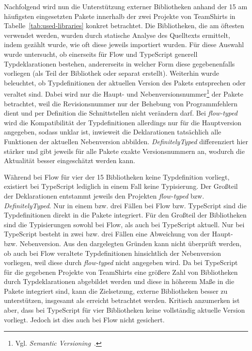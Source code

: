 Nachfolgend wird nun die Unterstützung externer Bibliotheken anhand der 15 am häufigsten eingesetzten Pakete innerhalb der zwei Projekte von TeamShirts in Tabelle~\ref{tab:used-libraries} konkret betrachtet. Die Bibliotheken, die am öftesten verwendet werden, wurden durch statische Analyse des Quelltexts ermittelt, indem gezählt wurde, wie oft diese jeweils importiert wurden. Für diese Auswahl wurde untersucht, ob einerseits für Flow und TypeScript generell Typdeklarationen bestehen, andererseits in welcher Form diese gegebenenfalls vorliegen (als Teil der Bibliothek oder separat erstellt). Weiterhin wurde beleuchtet, ob Typdefinitionen der aktuellen Version des Pakets entsprechen oder veraltet sind. Dabei wird nur die Haupt- und Nebenversionsnummer\footnote{Vgl. \textit{Semantic Versioning}~\autocite{SEMANTIC_VERSIONING}.} der Pakete betrachtet, weil die Revisionsnummer nur der Behebung von Programmfehlern dient und per Definition die Schnittstellen nicht verändern darf. Bei \textit{flow-typed} wird die Kompatibilität der Typdefinitionen allerdings nur für die Hauptversion angegeben, sodass unklar ist, inwieweit die Deklarationen tatsächlich alle Funktionen der aktuellen Nebenversion abbilden. \textit{DefinitelyTyped} differenziert hier stärker und gibt jeweils für alle Pakete exakte Versionsnummern an, wodurch die Aktualität besser eingeschätzt werden kann.

\medbreak


Während bei Flow für vier der 15 Bibliotheken keine Typdefinition vorliegt, existiert bei TypeScript lediglich in einem Fall keine Typisierung. Der Großteil der Deklarationen entstammt jeweils den Projekten \textit{flow-typed} bzw. \textit{DefinitelyTyped}. Nur in einem bzw. drei Fällen bei Flow bzw. TypeScript sind die Typdefinitionen direkt in die Pakete integriert.
Für den Großteil der Bibliotheken sind die Typisierungen sowohl bei Flow, als auch bei TypeScript aktuell. Nur bei TypeScript besteht in zwei bzw. drei Fällen eine Abweichung von der Haupt- bzw. Nebenversion. Aus den dargelegten Gründen kann nicht überprüft werden, ob auch bei Flow veraltete Typdefinitionen hinsichtlich der Nebenversion vorliegen, weil diese durch \textit{flow-typed} nicht angegeben wird. Da bei TypeScript für die gegebenen Projekte von TeamShirts eine größere Zahl von Bibliotheken durch Typdeklarationen abgebildet werden und diese in höherem Maße in die Pakete integriert sind, kann die Zielsetzung, externe Bibliotheken besser zu unterstützen, insgesamt als erreicht betrachtet werden. Kritisch anzumerken ist aber, dass bei TypeScript für vier Bibliotheken keine vollständig aktuelle Version vorliegt. Jedoch ist dies auch bei Flow nicht gesichert.

